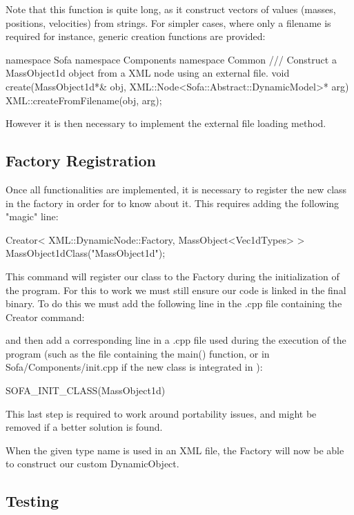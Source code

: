 Note that this function is quite long, as it construct vectors of values (masses, positions, velocities) from strings. For simpler cases, where only a filename is required for instance, generic creation functions are provided:
\begin{code_cpp}
namespace Sofa { namespace Components { namespace Common {
/// Construct a MassObject1d object from a XML node using an external file.
void create(MassObject1d*& obj, XML::Node<Sofa::Abstract::DynamicModel>* arg)
{
  XML::createFromFilename(obj, arg);
} } } }
\end{code_cpp}
However it is then necessary to implement the external file loading method.

\subsection{Factory Registration}

Once all functionalities are implemented, it is necessary to register the new class in the  factory in order for \sofa{} to know about it. This requires adding the following "magic" line:

\begin{code_cpp}
Creator< XML::DynamicNode::Factory, MassObject<Vec1dTypes> >
  MassObject1dClass("MassObject1d");
\end{code_cpp}

This command will register our class to the Factory during the initialization of the program. For this to work we must still ensure our code is linked in the final binary. To do this we must add the following line in the .cpp file containing the Creator command:
\begin{code_cpp}
\end{code_cpp}
and then add a corresponding line in a .cpp file used during the execution of the program (such as the file containing the main() function, or in Sofa/Components/init.cpp if the new class is integrated in \sofa{}):
\begin{code_cpp}
SOFA_INIT_CLASS(MassObject1d)
\end{code_cpp}
This last step is required to work around portability issues, and might be removed if a better solution is found.

When the given type name is used in an XML file, the Factory will now be able to construct our custom DynamicObject.

\subsection{Testing}

